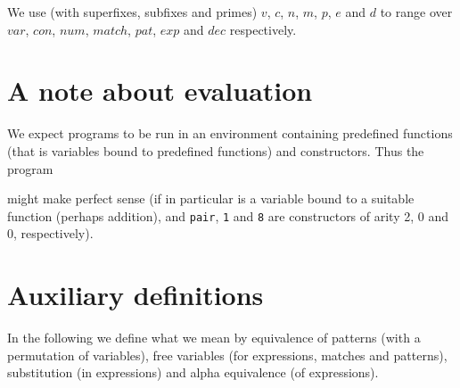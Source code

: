 We use (with superfixes, subfixes and primes) $v$, $c$, $n$, $m$, $p$, $e$
and $d$ to range over $var$, $con$, $num$, $match$, $pat$, $exp$ and $dec$
respectively.

\section{A note about evaluation}
We expect programs to be run in an environment containing predefined functions
(that is variables bound to predefined functions) and constructors. Thus the
program
\begin{quote}
\end{quote}
might make perfect sense (if in particular  is a variable bound to a
suitable function (perhaps addition), and \texttt{pair}, \texttt{1} and
\texttt{8} are constructors of arity 2, 0 and 0, respectively).
\section{Auxiliary definitions}
\label{sec:auxil-defin}

In the following we define what we mean by equivalence of patterns (with a
permutation of variables), free variables (for expressions, matches and
patterns), substitution (in expressions) and alpha equivalence (of expressions).

